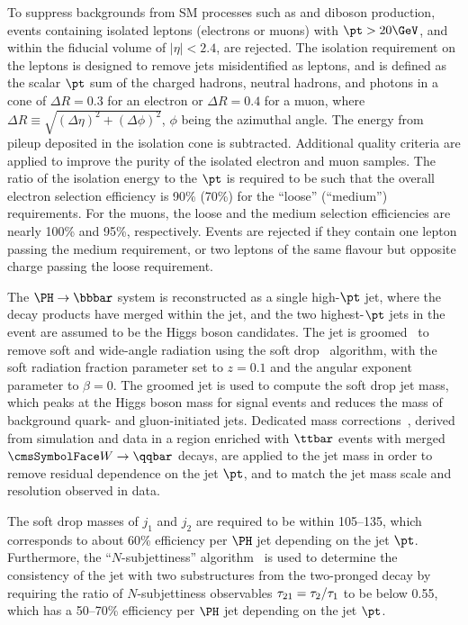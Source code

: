 To suppress backgrounds from SM processes such as \ttjets and
diboson production, events containing isolated leptons (electrons or
muons) with $\pt > 20\GeV$, and within the fiducial volume of $|\eta| <
2.4$, are rejected. The isolation requirement on the leptons is
designed to remove jets misidentified as leptons, and is defined as
the scalar $\pt$ sum of the charged hadrons, neutral hadrons, and
photons in a cone of $\Delta R = 0.3$ for an electron or $\Delta R =
0.4$ for a muon, where $\Delta R \equiv \sqrt{(\Delta\eta)^2 +
  (\Delta\phi)^2}$, $\phi$ being the azimuthal angle. The energy from
pileup deposited in the isolation cone is subtracted. Additional
quality criteria are applied to improve the purity of the isolated electron and muon samples.
The ratio of the isolation energy to the $\pt$ is required to be such that the overall
electron selection efficiency is 90\% (70\%) for the ``loose''
(``medium'') requirements. For the muons, the loose and the medium
selection efficiencies are nearly 100\% and 95\%, respectively. Events
are rejected if they contain one lepton passing the medium
requirement, or two leptons of the same flavour but opposite charge
passing the loose requirement.

The $\PH \to \bbbar$ system is reconstructed as a single high-$\pt$
jet, where the decay products have merged within the jet, and the two
highest-$\pt$ jets in the event are assumed to be the Higgs boson
candidates. The jet is groomed~\cite{Salam:2009jx} to remove soft and
wide-angle radiation using the soft
drop~\cite{Dasgupta:2013ihk,Larkoski:2014wba} algorithm, with the soft
radiation fraction parameter set to $z= 0.1$ and the angular
exponent parameter to $\beta = 0$. The groomed jet is used
to compute the soft drop jet mass, which peaks at the Higgs boson mass
for signal events and reduces the mass of background quark- and
gluon-initiated jets. Dedicated mass
corrections~\cite{CMS-PAS-JME-16-003}, derived from simulation and
data in a region enriched with $\ttbar$ events with merged
$\PW \to \qqbar$ decays, are applied to the jet mass in order to remove
residual dependence on the jet $\pt$, and to match the jet mass scale
and resolution observed in data.

The soft drop masses of $j_{1}$ and $j_{2}$ are required
to be within 105--135\GeV, which corresponds to about 60\% efficiency
per $\PH$ jet depending on the jet $\pt$. Furthermore, the
``$N$-subjettiness'' algorithm~\cite{Thaler:2011gf} is used to
determine the consistency of the jet with two substructures from the
two-pronged \Hbb decay by requiring the ratio of $N$-subjettiness
observables $\tau_{21} = \tau_2/\tau_1$ to be below 0.55, which has a
50--70\% efficiency per $\PH$ jet depending on the jet $\pt$.

